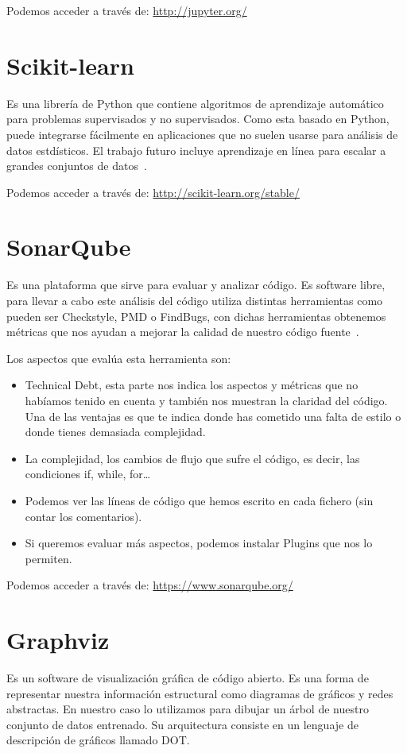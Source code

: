 Podemos acceder a través de: 
\url{http://jupyter.org/}	

\section{Scikit-learn}
Es una librería de Python que contiene algoritmos de aprendizaje automático para problemas supervisados y no supervisados. Como esta basado en Python, puede integrarse fácilmente en aplicaciones que no suelen usarse para análisis de datos estdísticos. El trabajo futuro incluye aprendizaje en línea para escalar a grandes conjuntos de datos~\cite{scikitlearn}. 

Podemos acceder a través de: 
\url{http://scikit-learn.org/stable/}

\section{SonarQube}
Es una plataforma que sirve para evaluar y analizar código. Es software libre, para llevar a cabo este análisis del código utiliza distintas herramientas como pueden ser Checkstyle, PMD o FindBugs, con dichas herramientas obtenemos métricas que nos ayudan a mejorar la calidad de nuestro código fuente~\cite{wiki:sonarqube}.

Los aspectos que evalúa esta herramienta son:
\begin{itemize}
	\item Technical Debt, esta parte nos indica los aspectos y métricas que no habíamos tenido en cuenta y también nos muestran la claridad del código. Una de las ventajas es que te indica donde has cometido una falta de estilo o donde tienes demasiada complejidad.
	\item La complejidad, los cambios de flujo que sufre el código, es decir, las condiciones if, while, for… 
	\item Podemos ver las líneas de código que hemos escrito en cada fichero (sin contar los comentarios).
	\item Si queremos evaluar más aspectos, podemos instalar Plugins que nos lo permiten.
\end{itemize}

Podemos acceder a través de: 
\url{https://www.sonarqube.org/}

\section{Graphviz}
Es un software de visualización gráfica de código abierto. Es una forma de representar nuestra información estructural como diagramas de gráficos y redes abstractas. En nuestro caso lo utilizamos para dibujar un  árbol de nuestro conjunto de datos entrenado. Su arquitectura consiste en un lenguaje de descripción de gráficos llamado DOT.

